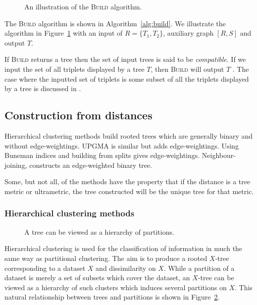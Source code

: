 \begin{figure}
  \centering
  
  \caption{An illustration of the \textsc{Build} algorithm.}
  \label{fig:build-ex}
\end{figure}

The \textsc{Build} algorithm is shown in Algorithm~\ref{alg:build}.  We
illustrate the algorithm in Figure~\ref{fig:build-ex} with an input of $R =
\{T_1,T_2\}$, auxiliary graph $[R,S]$ and output $T$.

If \textsc{Build} returns a tree then the set of input trees is said to be
\textit{compatible}.  If we input the set of all triplets displayed by a tree
$T$, then \textsc{Build} will output $T$ \cite{semple2003phylogenetics}.  The
case where the inputted set of triplets is some subset of all the triplets
displayed by a tree is discussed in \cite[Section
2.5.2]{bryant97buildingtrees}.

\subsection{Construction from distances}
\label{sec:constr-from-dist}

Hierarchical clustering methods build rooted trees which are generally binary
and without edge-weightings.  UPGMA is similar but adds edge-weightings.
Using Buneman indices and building from splits gives edge-weightings.
Neighbour-joining, constructs an edge-weighted binary tree.

Some, but not all, of the methods have the property that if the distance is a
tree metric or ultrametric, the tree constructed will be the unique tree for
that metric.

\subsubsection{Hierarchical clustering methods}
\label{sec:hier-clust-meth}

\begin{figure}
  \centering
  
  \caption{A tree can be viewed as a hierarchy of partitions.}
  \label{fig:tree-clust-ex}
\end{figure}

Hierarchical clustering is used for the classification of information in much
the same way as partitional clustering.  The aim is to produce a rooted
$X$-tree corresponding to a dataset $X$ and dissimilarity on $X$.  While a
partition of a dataset is merely a set of subsets which cover the dataset, an
$X$-tree can be viewed as a hierarchy of such clusters which induces several
partitions on $X$.  This natural relationship between trees and partitions is
shown in Figure~\ref{fig:tree-clust-ex}.

